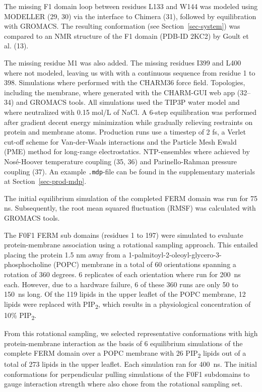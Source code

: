 \documentclass[
  letterpaper,
  DIV=11,
  numbers=noendperiod]{scrartcl}
\begin{document}
The missing F1 domain loop between residues L133 and W144 was modeled
using MODELLER (29, 30) via the interface to Chimera (31), followed by
equilibration with GROMACS. The resulting conformation (see
Section~\ref{sec-system}) was compared to an NMR structure of the F1
domain (PDB-ID 2KC2) by Goult et al. (13).

The missing residue M1 was also added. The missing residues I399 and
L400 where not modeled, leaving us with with a continuous sequence from
residue 1 to 398. Simulations where performed with the CHARM36 force
field. Topologies, including the membrane, where generated with the
CHARM-GUI web app (32--34) and GROMACS tools. All simulations used the
TIP3P water model and where neutralized with 0.15 mol/L of NaCl. A
6-step equilibration was performed after gradient decent energy
minimization while gradually relieving restraints on protein and
membrane atoms. Production runs use a timestep of 2 fs, a Verlet cut-off
scheme for Van-der-Waals interactions and the Particle Mesh Ewald (PME)
method for long-range electrostatics. NTP-ensembles where achieved by
Nosé-Hoover temperature coupling (35, 36) and Parinello-Rahman pressure
coupling (37). An example \texttt{.mdp}-file can be found in the
supplementary materials at Section~\ref{sec-prod-mdp}.

The initial equilibrium simulation of the completed FERM domain was run
for 75 ns. Subsequently, the root mean squared fluctuation (RMSF) was
calculated with GROMACS tools.

The F0F1 FERM sub domains (residues 1 to 197) were simulated to evaluate
protein-membrane association using a rotational sampling approach. This
entailed placing the protein 1.5 nm away from a
1-palmitoyl-2-oleoyl-glycero-3-phosphocholine (POPC) membrane in a total
of 60 orientations spanning a rotation of 360 degrees. 6 replicates of
each orientation where run for 200~ns each. However, due to a hardware
failure, 6 of these 360 runs are only 50 to 150~ns long. Of the 119
lipids in the upper leaflet of the POPC membrane, 12 lipids were
replaced with PIP\textsubscript{2}, which results in a physiological
concentration of 10\% PIP\textsubscript{2}.

From this rotational sampling, we selected representative conformations
with high protein-membrane interaction as the basis of 6 equilibrium
simulations of the complete FERM domain over a POPC membrane with 26
PIP\textsubscript{2} lipids out of a total of 273 lipids in the upper
leaflet. Each simulation ran for 400~ns. The initial conformations for
perpendicular pulling simulations of the F0F1 subdomains to gauge
interaction strength where also chose from the rotational sampling set.
\end{document}
